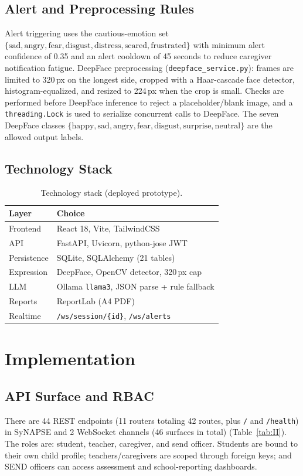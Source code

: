 \documentclass[conference]{IEEEtran}
\begin{document}
\subsection{Alert and Preprocessing Rules}
Alert triggering uses the cautious-emotion set $\{\mathrm{sad},\mathrm{angry},\mathrm{fear},\mathrm{disgust},\mathrm{distress},\mathrm{scared},\mathrm{frustrated}\}$ with minimum alert confidence of 0.35 and an alert cooldown of 45 seconds to reduce caregiver notification fatigue. DeepFace preprocessing (\texttt{deepface\_service.py}): frames are limited to 320\,px on the longest side, cropped with a Haar-cascade face detector, histogram-equalized, and resized to 224\,px when the crop is small. Checks are performed before DeepFace inference to reject a placeholder/blank image, and a \texttt{threading.Lock} is used to serialize concurrent calls to DeepFace. The seven DeepFace classes $\{\mathrm{happy},\mathrm{sad},\mathrm{angry},\mathrm{fear},\mathrm{disgust},\mathrm{surprise},\mathrm{neutral}\}$ are the allowed output labels.

\subsection{Technology Stack}
\begin{table}[!t]
\caption{Technology stack (deployed prototype).}
\label{tab:I}
\centering
\small
\begin{tabular}{@{}ll@{}}
\toprule
\textbf{Layer} & \textbf{Choice} \\
\midrule
Frontend & React 18, Vite, TailwindCSS \\
API & FastAPI, Uvicorn, python-jose JWT \\
Persistence & SQLite, SQLAlchemy (21 tables) \\
Expression & DeepFace, OpenCV detector, 320\,px cap \\
LLM & Ollama \texttt{llama3}, JSON parse + rule fallback \\
Reports & ReportLab (A4 PDF) \\
Realtime & \texttt{/ws/session/\{id\}}, \texttt{/ws/alerts} \\
\bottomrule
\end{tabular}
\end{table}

\section{Implementation}
\subsection{API Surface and RBAC}
There are 44 REST endpoints (11 routers totaling 42 routes, plus \texttt{/} and \texttt{/health}) in SyNAPSE and 2 WebSocket channels (46 surfaces in total) (Table~\ref{tab:II}). The roles are: student, teacher, caregiver, and send officer. Students are bound to their own child profile; teachers/caregivers are scoped through foreign keys; and SEND officers can access assessment and school-reporting dashboards.
\end{document}
